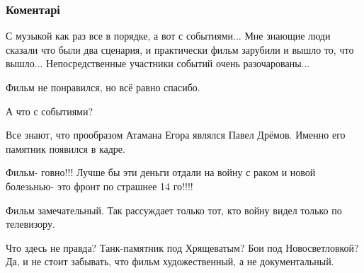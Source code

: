  
 
 
 
 
\subsubsection{Коментарі}

\begin{itemize} %
С музыкой как раз все в порядке, а вот с событиями... Мне знающие люди сказали что были два сценария, и практически фильм зарубили и вышло то, что вышло... Непосредственные участники событий очень разочарованы...

Фильм не понравился, но всё равно спасибо.

А что с событиями?

Все знают, что прообразом Атамана Егора являлся Павел Дрёмов. Именно его памятник появился в кадре.

Фильм- говно!!! Лучше бы эти деньги отдали на войну с раком и новой болезьнью- это фронт по страшнее 14 го!!!!

Фильм замечательный. Так рассуждает только тот, кто войну видел только по телевизору.

Что здесь не правда? Танк-памятник под Хрящеватым? Бои под Новосветловкой? Да, и не стоит забывать, что фильм художественный, а не документальный.
\end{itemize} %
